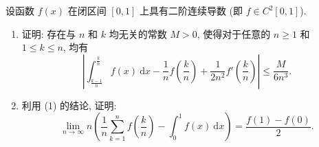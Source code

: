 \begin{question}[points = 10]
设函数 $f(x)$ 在闭区间 $[0,1]$ 上具有二阶连续导数 (即 $f \in C^2[0,1]$).
\begin{enumerate}
\item 证明: 存在与 $n$ 和 $k$ 均无关的常数 $M > 0$, 使得对于任意的 $n \geqslant 1$ 和 $1 \leqslant k \leqslant n$, 均有
$$ \left| \int_{\frac{k-1}{n}}^{\frac{k}{n}} f(x) ~ \mathrm{d}x - \frac{1}{n} f\left(\frac{k}{n}\right) + \frac{1}{2n^2} f'\left(\frac{k}{n}\right) \right| \leqslant \frac{M}{6n^3}. $$

\item 利用 (1) 的结论, 证明:
$$ \lim_{n \to \infty} n \left( \frac{1}{n} \sum_{k=1}^n f\left(\frac{k}{n}\right) - \int_0^1 f(x) ~ \mathrm{d}x \right) = \frac{f(1) - f(0)}{2}. $$
\end{enumerate}

\end{question}

